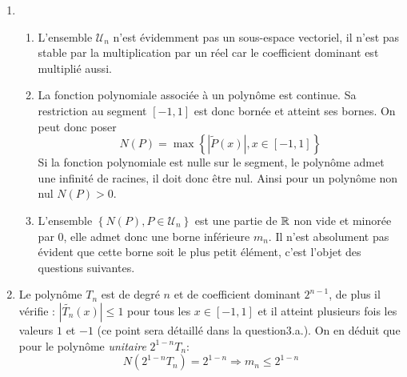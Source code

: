 \begin{enumerate}
 \item \begin{enumerate}
 \item L'ensemble $\mathcal U_n$ n'est évidemment pas un sous-espace vectoriel, il n'est pas stable par la multiplication par un réel car le coefficient dominant est multiplié aussi.
\item La fonction polynomiale associée à un polynôme est continue. Sa restriction au segment $[-1,1]$ est donc bornée et atteint ses bornes. On peut donc poser 
\begin{displaymath}
N(P)=\max\left\lbrace \left\vert\widetilde{P}(x)\right\vert, x\in[-1,1]\right\rbrace  
\end{displaymath}
Si la fonction polynomiale est nulle sur le segment, le polynôme admet une infinité de racines, il doit donc être nul. Ainsi pour un polynôme non nul $N(P)>0$.
\item L'ensemble $\left\lbrace N(P), P\in \mathcal U_n \right\rbrace$ est une partie de $\mathbb{R}$ non vide et minorée par $0$, elle admet donc une borne inférieure $m_n$. Il n'est absolument pas évident que cette borne soit le plus petit élément, c'est l'objet des questions suivantes.
\end{enumerate}

\item Le polynôme $T_n$ est de degré $n$ et de coefficient dominant $2^{n-1}$, de plus il vérifie : $|\widetilde{T_n}(x)|\leq1$ pour tous les $x\in[-1,1]$ et il atteint plusieurs fois les valeurs $1$ et $-1$ (ce point sera détaillé dans la question3.a.). On en déduit que pour le polynôme \emph{unitaire} $2^{1-n}T_n$:
\begin{displaymath}
 N(2^{1-n}T_n)= 2^{1-n} \Rightarrow m_n \leq 2^{1-n}
\end{displaymath}



\end{enumerate}
